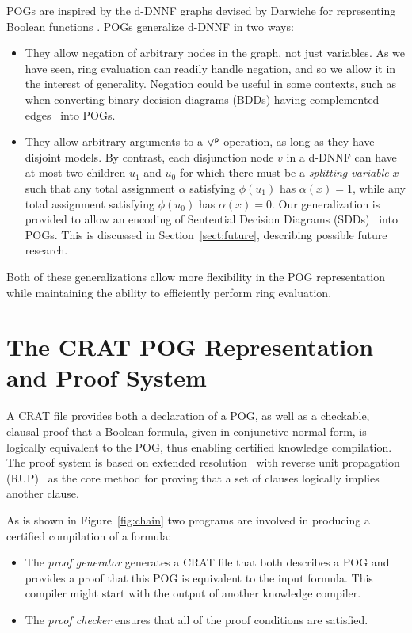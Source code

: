 \documentclass[letterpaper,USenglish,cleveref, autoref, thm-restate]{lipics-v2021}
\newcommand{\por}{\mathbin{\lor^{\sf p}}}
\newcommand{\assign}{\alpha}
\begin{document}
POGs are inspired by the d-DNNF graphs devised by Darwiche for
representing Boolean functions \cite{darwiche:jair:2002}.
POGs generalize d-DNNF in two ways:
\begin{itemize}
\item They allow negation of arbitrary nodes in the graph, not just
  variables.  As we have seen, ring evaluation can readily handle negation, and so we allow it in the interest of generality.
  Negation could be useful in some contexts, such as when
  converting binary decision diagrams (BDDs) having complemented
  edges~\cite{brace-dac-1990,minato-dac-1990} into POGs.

\item They allow arbitrary arguments to a $\por$ operation, as long as
  they have disjoint models.  By contrast, each
  disjunction node $v$ in a d-DNNF can have at most two children $u_1$ and $u_0$ for which there must be a {\em splitting variable} $x$ such that
  any total assignment $\assign$ satisfying $\phi(u_1)$ has $\assign(x)=1$, while any total assignment satisfying $\phi(u_0)$ has
  $\assign(x)=0$.  Our generalization is provided to allow an
  encoding of Sentential Decision Diagrams (SDDs)~\cite{darwiche:ijcai:2011} into
  POGs.  This is discussed in Section~\ref{sect:future}, describing possible future research.
\end{itemize}
  Both of these generalizations allow more flexibility in the POG
  representation while maintaining the ability to efficiently perform ring evaluation.


\section{The CRAT POG Representation and Proof System}

A CRAT file provides both a declaration of a POG, as well as a checkable, clausal
proof that a Boolean formula, given in conjunctive normal
form, is logically equivalent to the POG, thus enabling certified
knowledge compilation.  The proof system is based on extended
resolution~\cite{Tseitin:1983} with reverse unit propagation
(RUP)~\cite{goldberg,vangelder08_verifying_rup_proofs} as the core method for
proving that a set of clauses logically implies another clause.

As is shown in Figure~\ref{fig:chain}
two programs are involved in producing a certified compilation of a formula:
\begin{itemize}
\item The {\em proof generator} generates a CRAT file that both describes a POG and provides a proof that this POG is equivalent to the input formula.
  This compiler might start with the output of another knowledge compiler.
\item The {\em proof checker} ensures that all of the proof conditions are satisfied.  
\end{itemize}
\end{document}
